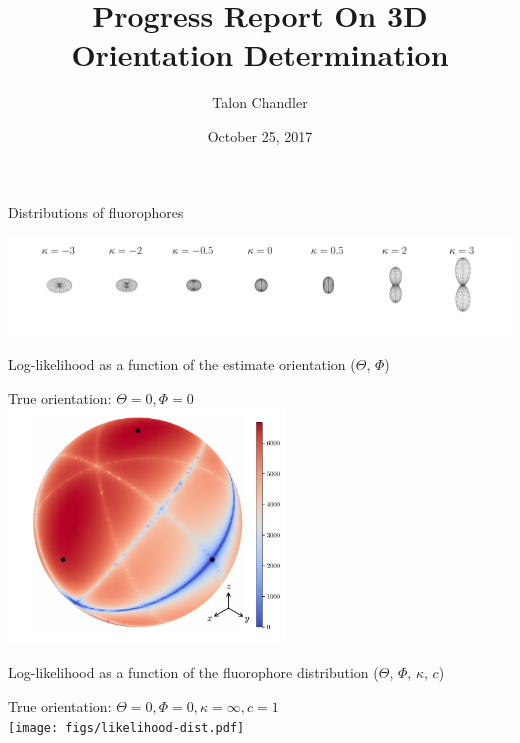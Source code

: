 \documentclass[presentation]{beamer}
\author{Talon Chandler}
\date{October 25, 2017}
\title{Progress Report On 3D Orientation Determination}
\begin{document}
\maketitle
\begin{frame}[label=sec-1]{Distributions of fluorophores}
\begin{center}
  \includegraphics[width=1.0\textwidth, interpolate=true]{figs/watson.pdf}\\
\end{center}
\end{frame}

\begin{frame}[label=sec-2]{Log-likelihood as a function of the estimate orientation ($\Theta$, $\Phi$)}
\begin{center}
True orientation: $\Theta = 0, \Phi = 0$\\
  \includegraphics[width=0.55\textwidth, interpolate=true]{figs/likelihood2.pdf}\\
\end{center}
\end{frame}

\begin{frame}[label=sec-3]{Log-likelihood as a function of the fluorophore distribution ($\Theta$, $\Phi$, $\kappa$, $c$)}
\begin{center}
True orientation: $\Theta = 0, \Phi = 0, \kappa = \infty, c = 1$\\
  \texttt{[image: figs/likelihood-dist.pdf]}\\
\end{center}
\end{frame}
\end{document}
